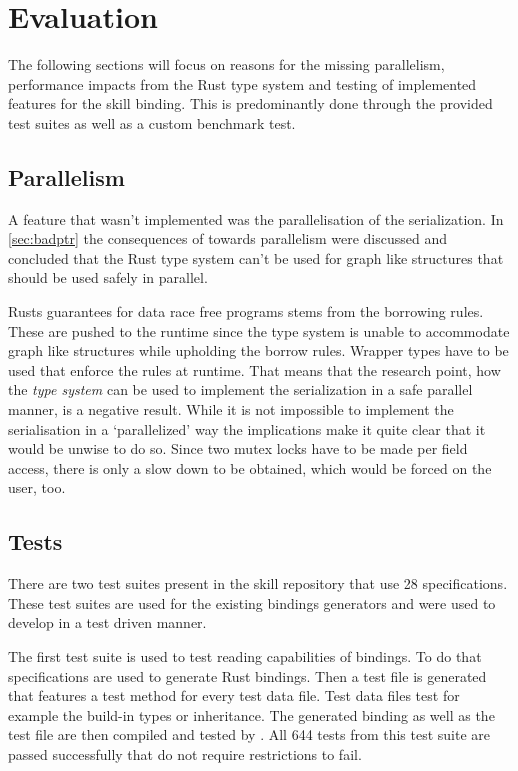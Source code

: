 \documentclass[thesis]{subfiles}
\begin{document}
\chapter{Evaluation}\label{chap:eval}
The following sections will focus on reasons for the missing parallelism, performance impacts from the Rust type system and testing of implemented features for the \gls{skill} binding.
This is predominantly done through the provided test suites as well as a custom benchmark test.

\section{Parallelism}
  A feature that wasn't implemented was the parallelisation of the serialization.
  In \autoref{sec:badptr} the consequences of \PtrT towards parallelism were discussed and concluded that the Rust type system can't be used for graph like structures that should be used safely in parallel.

  Rusts guarantees for data race free programs stems from the borrowing rules.
  These are pushed to the runtime since the type system is unable to accommodate graph like structures while upholding the borrow rules.
  Wrapper types have to be used that enforce the rules at runtime.
  That means that the research point, how the \emph{type system} can be used to implement the serialization in a safe parallel manner, is a negative result.
  While it is not impossible to implement the serialisation in a `parallelized' way the implications make it quite clear that it would be unwise to do so.
  Since two mutex locks have to be made per field access, there is only a slow down to be obtained, which would be forced on the user, too.

\section{Tests}
  There are two test suites present in the \gls{skill} repository\autocite{skill-repo} that use 28 specifications.
  These test suites are used for the existing bindings generators and were used to develop in a test driven manner.

  The first test suite is used to test reading capabilities of bindings.
  To do that specifications are used to generate Rust bindings.
  Then a test file is generated that features a test method for every test data file.
  Test data files test for example the build-in types or inheritance.
  The generated binding as well as the test file are then compiled and tested by .
  All 644 tests from this test suite are passed successfully that do not require restrictions to fail.%
\end{document}
